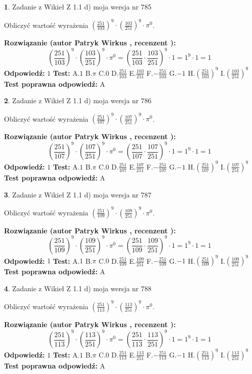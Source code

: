 \documentclass[12pt, a4paper]{article}
\theoremstyle{definition} %
\newtheorem{zad}{}
\newcommand{\zadStart}[1]{\begin{zad}#1\newline}
\newcommand{\zadStop}{\end{zad}}
\newcommand{\rozwStart}[2]{\noindent \textbf{Rozwiązanie (autor #1 , recenzent #2): }\newline}
\newcommand{\rozwStop}{\newline}
\newcommand{\odpStart}{\noindent \textbf{Odpowiedź:}\newline}
\newcommand{\odpStop}{\newline}
\newcommand{\testStart}{\noindent \textbf{Test:}\newline}
\newcommand{\testStop}{\newline}
\newcommand{\kluczStart}{\noindent \textbf{Test poprawna odpowiedź:}\newline}
\newcommand{\kluczStop}{\newline}
\begin{document}
\zadStart{Zadanie z Wikieł Z 1.1 d) moja wersja nr 785}

Obliczyć wartość wyrażenia $(\frac{251}{103})^{9} \cdot (\frac{103}{251})^{9} \cdot \pi^{0}$.
\zadStop
\rozwStart{Patryk Wirkus}{}
$$(\frac{251}{103})^{9} \cdot (\frac{103}{251})^{9} \cdot \pi^{0} = (\frac{251}{103} \cdot \frac{103}{251})^{9} \cdot 1 = 1^{9} \cdot 1 = 1$$
\rozwStop
\odpStart
$1$
\odpStop
\testStart
A.$1$ B.$\pi$ C.$0$ D.$\frac{251}{103}$ E.$\frac{103}{251}$
F.$-\frac{251}{103}$ G.$-1$
H.$(\frac{251}{103})^{9}$
I.$(\frac{103}{251})^{9}$
\testStop
\kluczStart
A
\kluczStop



\zadStart{Zadanie z Wikieł Z 1.1 d) moja wersja nr 786}

Obliczyć wartość wyrażenia $(\frac{251}{107})^{9} \cdot (\frac{107}{251})^{9} \cdot \pi^{0}$.
\zadStop
\rozwStart{Patryk Wirkus}{}
$$(\frac{251}{107})^{9} \cdot (\frac{107}{251})^{9} \cdot \pi^{0} = (\frac{251}{107} \cdot \frac{107}{251})^{9} \cdot 1 = 1^{9} \cdot 1 = 1$$
\rozwStop
\odpStart
$1$
\odpStop
\testStart
A.$1$ B.$\pi$ C.$0$ D.$\frac{251}{107}$ E.$\frac{107}{251}$
F.$-\frac{251}{107}$ G.$-1$
H.$(\frac{251}{107})^{9}$
I.$(\frac{107}{251})^{9}$
\testStop
\kluczStart
A
\kluczStop



\zadStart{Zadanie z Wikieł Z 1.1 d) moja wersja nr 787}

Obliczyć wartość wyrażenia $(\frac{251}{109})^{9} \cdot (\frac{109}{251})^{9} \cdot \pi^{0}$.
\zadStop
\rozwStart{Patryk Wirkus}{}
$$(\frac{251}{109})^{9} \cdot (\frac{109}{251})^{9} \cdot \pi^{0} = (\frac{251}{109} \cdot \frac{109}{251})^{9} \cdot 1 = 1^{9} \cdot 1 = 1$$
\rozwStop
\odpStart
$1$
\odpStop
\testStart
A.$1$ B.$\pi$ C.$0$ D.$\frac{251}{109}$ E.$\frac{109}{251}$
F.$-\frac{251}{109}$ G.$-1$
H.$(\frac{251}{109})^{9}$
I.$(\frac{109}{251})^{9}$
\testStop
\kluczStart
A
\kluczStop



\zadStart{Zadanie z Wikieł Z 1.1 d) moja wersja nr 788}

Obliczyć wartość wyrażenia $(\frac{251}{113})^{9} \cdot (\frac{113}{251})^{9} \cdot \pi^{0}$.
\zadStop
\rozwStart{Patryk Wirkus}{}
$$(\frac{251}{113})^{9} \cdot (\frac{113}{251})^{9} \cdot \pi^{0} = (\frac{251}{113} \cdot \frac{113}{251})^{9} \cdot 1 = 1^{9} \cdot 1 = 1$$
\rozwStop
\odpStart
$1$
\odpStop
\testStart
A.$1$ B.$\pi$ C.$0$ D.$\frac{251}{113}$ E.$\frac{113}{251}$
F.$-\frac{251}{113}$ G.$-1$
H.$(\frac{251}{113})^{9}$
I.$(\frac{113}{251})^{9}$
\testStop
\kluczStart
A
\kluczStop
\end{document}
